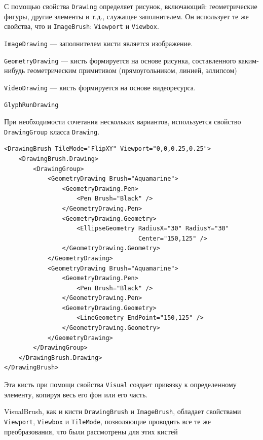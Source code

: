 \begin{description}[style=nextline]
\item [\texttt{DrawingBrush}] С помощью свойства \texttt{Drawing} определяет рисунок, включающий: геометрические фигуры, другие элементы и т.д., служащее заполнителем. Он использует те же свойства, что и \texttt{ImageBrush}: \texttt{Viewport} и \texttt{Viewbox}.

\texttt{ImageDrawing} — заполнителем кисти является изображение.

\texttt{GeometryDrawing} — кисть формируется на основе рисунка, составленного каким-нибудь геометрическим примитивом (прямоугольником, линией, эллипсом)

\texttt{VideoDrawing} — кисть формируется на основе видеоресурса.

\texttt{GlyphRunDrawing}

При необходимости сочетания нескольких вариантов, используется свойство \texttt{DrawingGroup} класса \texttt{Drawing}.

\begin{verbatim}
<DrawingBrush TileMode="FlipXY" Viewport="0,0,0.25,0.25">
    <DrawingBrush.Drawing>
        <DrawingGroup>
            <GeometryDrawing Brush="Aquamarine">
                <GeometryDrawing.Pen>
                    <Pen Brush="Black" />
                </GeometryDrawing.Pen>
                <GeometryDrawing.Geometry>
                    <EllipseGeometry RadiusX="30" RadiusY="30" 
                                     Center="150,125" />
                </GeometryDrawing.Geometry>
            </GeometryDrawing>
            <GeometryDrawing Brush="Aquamarine">
                <GeometryDrawing.Pen>
                    <Pen Brush="Black" />
                </GeometryDrawing.Pen>
                <GeometryDrawing.Geometry>
                    <LineGeometry EndPoint="150,125" />
                </GeometryDrawing.Geometry>
            </GeometryDrawing>
        </DrawingGroup>
    </DrawingBrush.Drawing>
</DrawingBrush>
\end{verbatim}

\item [\texttt{VisualBrush}] Эта кисть при помощи свойства \texttt{Visual} создает привязку к определенному элементу, копируя весь его фон или его часть.

VisualBrush, как и кисти \texttt{DrawingBrush} и \texttt{ImageBrush}, обладает свойствами \texttt{Viewport}, \texttt{Viewbox} и \texttt{TileMode}, позволяющие проводить все те же преобразования, что были рассмотрены для этих кистей


\end{description}
